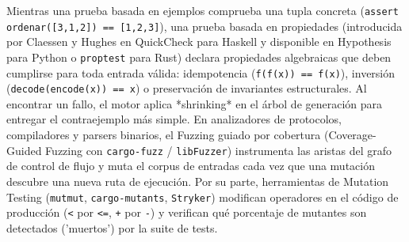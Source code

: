 \documentclass{book}
\begin{document}
Mientras una prueba basada en ejemplos comprueba una tupla concreta (\texttt{assert ordenar([3,1,2]) == [1,2,3]}), una prueba basada en propiedades (introducida por Claessen y Hughes en QuickCheck para Haskell y disponible en Hypothesis para Python o \texttt{proptest} para Rust) declara propiedades algebraicas que deben cumplirse para toda entrada válida: idempotencia (\texttt{f(f(x)) == f(x)}), inversión (\texttt{decode(encode(x)) == x}) o preservación de invariantes estructurales. Al encontrar un fallo, el motor aplica *shrinking* en el árbol de generación para entregar el contraejemplo más simple.
En analizadores de protocolos, compiladores y parsers binarios, el Fuzzing guiado por cobertura (Coverage-Guided Fuzzing con \texttt{cargo-fuzz} / \texttt{libFuzzer}) instrumenta las aristas del grafo de control de flujo y muta el corpus de entradas cada vez que una mutación descubre una nueva ruta de ejecución. Por su parte, herramientas de Mutation Testing (\texttt{mutmut}, \texttt{cargo-mutants}, \texttt{Stryker}) modifican operadores en el código de producción (\texttt{<} por \texttt{<=}, \texttt{+} por \texttt{-}) y verifican qué porcentaje de mutantes son detectados ('muertos') por la suite de tests.
\end{document}
